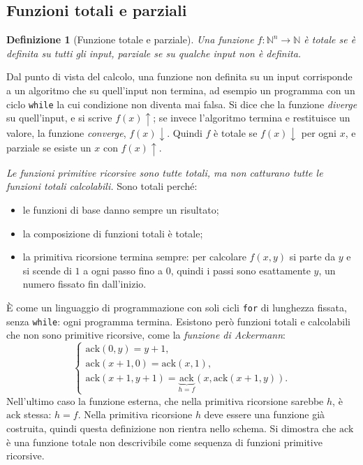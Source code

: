 \documentclass[a4paper, 11pt, oneside]{book}
\theoremstyle{formale}
\newtheorem*{definition}{Definizione}
\begin{document}
    \subsection{Funzioni totali e parziali}
    \begin{definition}[Funzione totale e parziale]
        Una funzione $f \colon \mathbb{N}^n \to \mathbb{N}$ \`e \emph{totale} se \`e
        definita su tutti gli input, \emph{parziale} se su qualche input non \`e
        definita.
    \end{definition}

    Dal punto di vista del calcolo, una funzione non definita su un input corrisponde a
    un algoritmo che su quell'input non termina, ad esempio un programma con un ciclo
    \texttt{while} la cui condizione non diventa mai falsa. Si dice che la funzione
    \emph{diverge} su quell'input, e si scrive $f(x)\uparrow$; se invece l'algoritmo
    termina e restituisce un valore, la funzione \emph{converge}, $f(x)\downarrow$.
    Quindi $f$ \`e totale se $f(x)\downarrow$ per ogni $x$, e parziale se esiste un $x$
    con $f(x)\uparrow$.

    \emph{Le funzioni primitive ricorsive sono tutte totali, ma non catturano tutte le
    funzioni totali calcolabili.} Sono totali perch\'e:
    \begin{itemize}
        \item le funzioni di base danno sempre un risultato;
        \item la composizione di funzioni totali \`e totale;
        \item la primitiva ricorsione termina sempre: per calcolare $f(x, y)$ si parte
            da $y$ e si scende di $1$ a ogni passo fino a $0$, quindi i passi sono
            esattamente $y$, un numero fissato fin dall'inizio.
    \end{itemize}
    \`E come un linguaggio di programmazione con soli cicli \texttt{for} di lunghezza
    fissata, senza \texttt{while}: ogni programma termina. Esistono per\`o funzioni
    totali e calcolabili che non sono primitive ricorsive, come la \emph{funzione di
    Ackermann}:
    \begin{equation*}
        \begin{cases}
            \mathrm{ack}(0, y) = y + 1, \\
            \mathrm{ack}(x + 1, 0) = \mathrm{ack}(x, 1), \\
            \mathrm{ack}(x + 1, y + 1)
                = \underbrace{\mathrm{ack}}_{h = f}(x, \mathrm{ack}(x + 1, y)).
        \end{cases}
    \end{equation*}
    Nell'ultimo caso la funzione esterna, che nella primitiva ricorsione sarebbe $h$, \`e
    $\mathrm{ack}$ stessa: $h = f$. Nella primitiva ricorsione $h$ deve essere una
    funzione gi\`a costruita, quindi questa definizione non rientra nello schema. Si
    dimostra che $\mathrm{ack}$ \`e una funzione totale non descrivibile come sequenza di
    funzioni primitive ricorsive.
\end{document}
